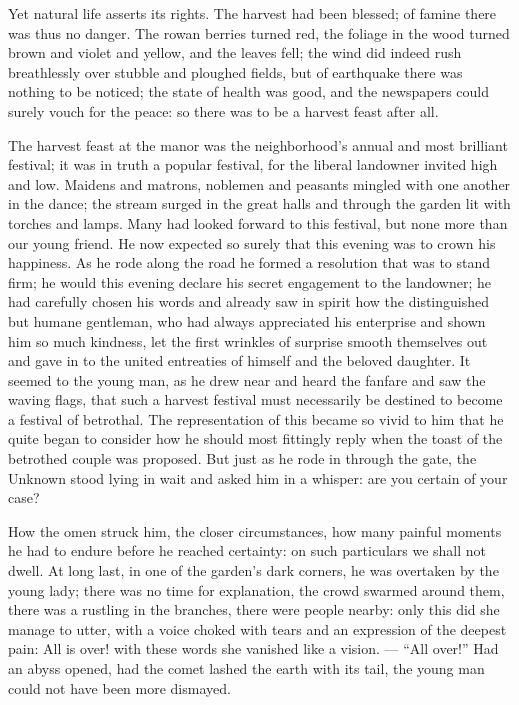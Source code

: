 \documentclass[12pt,a4paper,openany]{book}
\newcommand{\opage}[1]{\marginnote{\footnotesize\textit{[#1]}}}
\begin{document}
Yet natural life asserts its rights. The harvest had been blessed; of famine there was thus no danger. The rowan
berries turned red, the foliage in the wood turned brown and violet and yellow, and the leaves
\setcounter{footnote}{0}%
\opage{3}fell; the wind did indeed rush breathlessly over stubble and ploughed fields, but of earthquake there was
nothing to be noticed; the state of health was good, and the newspapers could surely vouch for the peace: so there was
to be a harvest feast after all.

The harvest feast at the manor was the neighborhood's annual and most brilliant festival; it was in truth a popular
festival, for the liberal landowner invited high and low. Maidens and matrons, noblemen and peasants mingled with one
another in the dance; the stream surged in the great halls and through the garden lit with torches and lamps. Many
had looked forward to this festival, but none more than our young friend. He now expected so surely that this evening
was to crown his happiness. As he rode along the road he formed a resolution that was to stand firm; he would this
evening declare his secret engagement to the landowner; he had carefully chosen his words and already saw in spirit
how the distinguished but humane gentleman, who had always appreciated his enterprise and shown him so much kindness,
let the first wrinkles of surprise smooth themselves out and gave in to the united entreaties of himself and the
beloved daughter. It seemed to the young man, as he drew near and heard the fanfare and saw the waving flags, that such
a harvest festival must necessarily be destined to become a festival of betrothal. The representation of this became so
vivid to him that he quite began to consider how he should most fittingly reply when the toast of the betrothed couple
was proposed. But just as he rode in through the gate, the Unknown stood lying in wait and asked him in a whisper: are
you certain of your case?

\setcounter{footnote}{0}%
\opage{4}How the omen struck him, the closer circumstances, how many painful moments he had to endure before he
reached certainty: on such particulars we shall not dwell. At long last, in one of the garden's dark corners, he was
overtaken by the young lady; there was no time for explanation, the crowd swarmed around them, there was a rustling in
the branches, there were people nearby: only this did she manage to utter, with a voice choked with tears and an
expression of the deepest pain: All is over! with these words she vanished like a vision. --- ``All over!'' Had an
abyss opened, had the comet lashed the earth with its tail, the young man could not have been more dismayed.
\end{document}
